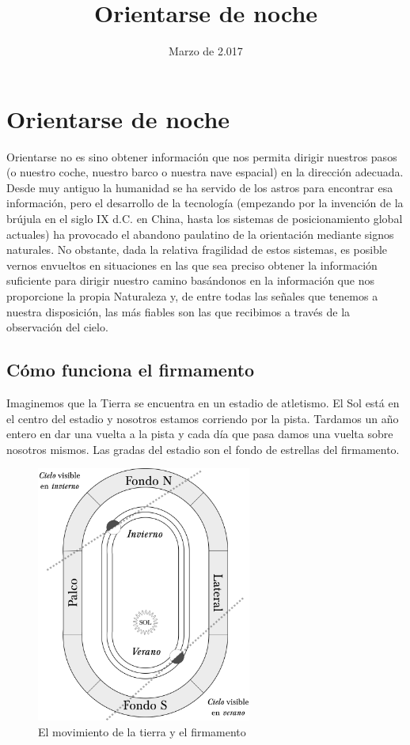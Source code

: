 \documentclass[11pt,a5paper,twoside]{amsbook}
\title{Orientarse de noche}
\date{Marzo de 2.017}
\begin{document}
\titulo

\tableofcontents

\cleardoublepage

\chapter*{Orientarse de noche}

\begin{sumario}[Introducci\'on]
Orientarse no es sino obtener información que nos permita dirigir nuestros pasos (o nuestro coche, nuestro barco o nuestra nave espacial) en la dirección adecuada. Desde muy antiguo la humanidad se ha servido de los astros para encontrar esa información, pero el desarrollo de la tecnología (empezando por la invención de la brújula en el siglo IX d.C. en China, hasta los sistemas de posicionamiento global actuales) ha provocado el abandono paulatino de la orientación mediante signos naturales. No obstante, dada la relativa fragilidad de estos sistemas, es posible vernos envueltos en situaciones en las que sea preciso obtener la información suficiente para dirigir nuestro camino basándonos en la información que nos proporcione la propia Naturaleza y, de entre todas las señales que tenemos a nuestra disposición, las más fiables son las que recibimos a través de la observación del cielo.
\end{sumario}

\section{C\'omo funciona el firmamento}

Imaginemos que la Tierra se encuentra en un estadio de atletismo. El Sol está en el centro del estadio y nosotros estamos corriendo por la pista. Tardamos un año entero en dar una vuelta a la pista y cada día que pasa damos una vuelta sobre nosotros mismos. Las gradas del estadio son el fondo de estrellas del firmamento.


\begin{figure}[ht]
 \centering
 \includegraphics[width=200pt,keepaspectratio=true]{./esquema_firmamento.png}
 \caption{El movimiento de la tierra y el firmamento}
 \label{carrera_tierra}
\end{figure}
\end{document}
